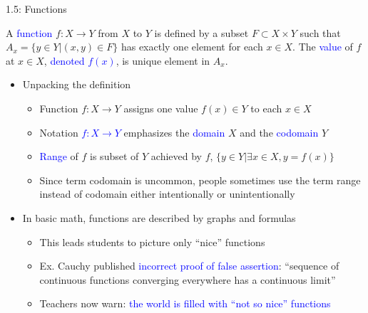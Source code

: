 \documentclass[10pt,english]{beamer}
\begin{document}
\begin{frame}{1.5: Functions}

\vspace{3mm}

\begin{definition}
A \textcolor{blue}{function} $f \colon X \rightarrow Y$ from $X$ to $Y$ is defined by a subset $F \subset X \times Y$ such that $A_x = \{ y\in Y | (x,y)\in F \}$ has exactly one element for each $x\in X$.
The \textcolor{blue}{value} of $f$ at $x\in X$, \textcolor{blue}{denoted $f(x)$}, is unique element in $A_x$.
\end{definition}
\vspace{-4mm}

\begin{itemize}
\setlength\itemsep{3mm}
\item<1-> Unpacking the definition \vspace{1mm}
\begin{itemize} 
  \setlength\itemsep{1.5mm}
  \item Function $f \colon X\rightarrow Y$ assigns one value $f(x)\in Y$ to each $x\in X$
  \item Notation \textcolor{blue}{$f \colon X \rightarrow Y$} emphasizes the \textcolor{blue}{domain} $X$ and the \textcolor{blue}{codomain} $Y$
  \item \textcolor{blue}{Range} of $f$ is subset of $Y$ achieved by $f$, $\{y \in Y | \exists x\in X, y=f(x) \}$
  \item Since term codomain is uncommon, people sometimes use the term range instead of codomain either intentionally or unintentionally
\end{itemize}

\item<2-> In basic math, functions are described by graphs and formulas \vspace{1mm}
\begin{itemize} 
  \setlength\itemsep{1.5mm}
  \item This leads students to picture only ``nice'' functions
  \item Ex. Cauchy published \textcolor{blue}{incorrect proof of false assertion}: ``sequence of continuous functions converging everywhere has a continuous limit''
  \item Teachers now warn: \textcolor{blue}{the world is filled with ``not so nice'' functions}
\end{itemize}

\end{itemize}
\end{frame}  
\end{document}
